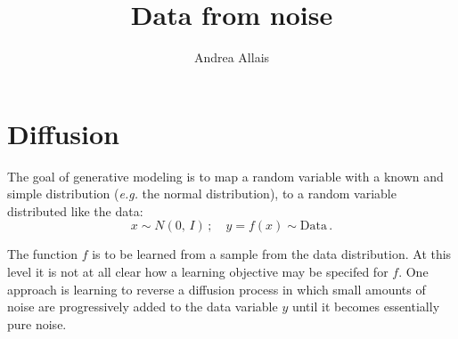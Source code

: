 \documentclass[10pt,letterpaper]{article}
\title{Data from noise}
\author{Andrea Allais}
\newcommand{\normal}[2]{N\!\left(#1,\,#2\right)}
\begin{document}
\maketitle

\section{Diffusion}

The goal of generative modeling is to map a random variable with a known and
simple distribution (\textit{e.g.} the normal distribution), to a random
variable distributed like the data:
\begin{equation}
    x \sim \normal{0}{I}\,; \quad y = f(x) \sim \mathrm{Data}\,.
\end{equation}

The function $f$ is to be learned from a sample from the data distribution.  At
this level it is not at all clear how a learning objective may be specifed for
$f$. One approach is learning to reverse a diffusion process in which small
amounts of noise are progressively added to the data variable $y$ until it
becomes essentially pure noise.
\end{document}
